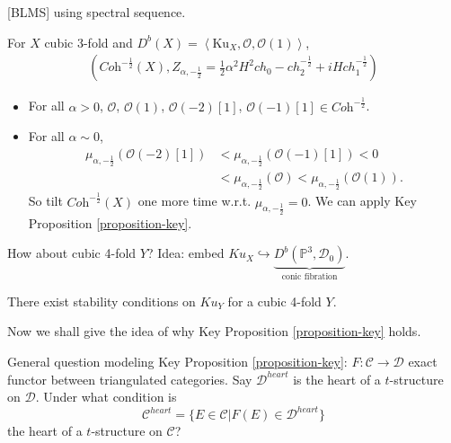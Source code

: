 [BLMS] using spectral sequence.

\begin{example}
\label{example-cubic-3-fold-continued}
For $X$ cubic 3-fold and
$D^b(X)=\left\langle{}\text{Ku}_X,\mathcal{O},
\mathcal{O}(1)\right\rangle{}$,
$$
\begin{aligned}
\left(\textit{Coh}^{-\frac{1}{2}}(X),
Z_{\alpha,-\frac{1}{2}}
=\frac{1}{2}\alpha^2H^2 ch_0
-ch_2^{-\frac{1}{2}}+iHch_1^{-\frac{1}{2}}
\right)
\end{aligned}
$$
\end{example}

\begin{exercise}
\label{exercise-duplicate-2}
\begin{itemize}
\item For all $\alpha>0$, $\mathcal{O}$,
$\mathcal{O}(1)$, $\mathcal{O}(-2)[1]$,
$\mathcal{O}(-1)[1]\in
\textit{Coh}^{-\frac{1}{2}}$.
\item For all $\alpha \sim 0$,
$$
\begin{aligned}
\mu_{\alpha,-\frac{1}{2}}(\mathcal{O}(-2)[1])
&<\mu_{\alpha,-\frac{1}{2}}(\mathcal{O}(-1)
[1]
)<0\\
&<\mu_{\alpha,-\frac{1}{2}}(\mathcal{O})
<\mu_{\alpha,-\frac{1}{2}}(\mathcal{O}(1)).
\end{aligned}
$$
So tilt $\textit{Coh}^{-\frac{1}{2}}(X)$ one
more time w.r.t.
$\mu_{\alpha,-\frac{1}{2}}=0$. We can apply
Key Proposition
\ref{proposition-key}.
\end{itemize}
\end{exercise}

\begin{example}
\label{example-cubic-4-fold}
How about cubic 4-fold $Y$? Idea: embed
$Ku_X\hookrightarrow
\underbrace{D^b(\mathbb{P}^3,\mathcal{D}_0)}
_{\text{conic fibration}}$.
\end{example}

\begin{theorem}
\label{theorem-exists-SC-for-cubic-4-fold}
There exist stability conditions on $Ku_Y$
for a cubic 4-fold $Y$.
\end{theorem}

\medskip\noindent
Now we shall give the idea of why Key
Proposition \ref{proposition-key} holds.

General question modeling Key Proposition
\ref{proposition-key}: $F: \mathcal{C} \to
\mathcal{D}$ exact functor between
triangulated categories. Say
$\mathcal{D}^{heart}$ is the heart of a
$t$-structure on $\mathcal{D}$. Under what
condition is
$$
\mathcal{C}^{heart}=\{E \in \mathcal{C}|F(E)
\in \mathcal{D}^{heart}\}
$$
the heart of a $t$-structure on
$\mathcal{C}$?

